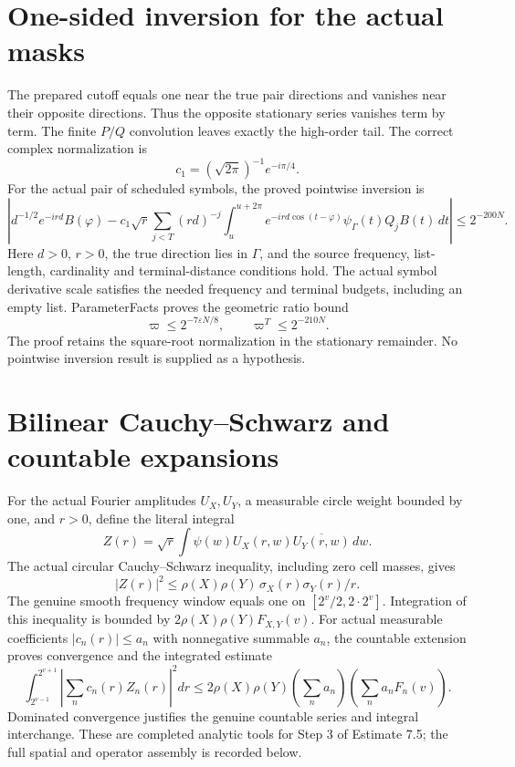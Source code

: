 \documentclass[11pt]{article}
\begin{document}
\newpage
\section*{One-sided inversion for the actual masks}
The prepared cutoff equals one near the true pair directions and vanishes
near their opposite directions. Thus the opposite stationary series vanishes
term by term. The finite $P/Q$ convolution leaves exactly the high-order tail.
The correct complex normalization is
\[
c_1=(\sqrt{2\pi})^{-1}e^{-i\pi/4}.
\]
For the actual pair of scheduled symbols, the proved pointwise inversion is
\[
\left|d^{-1/2}e^{-ird}B(\varphi)-c_1\sqrt r
\sum_{j<T}(rd)^{-j}\int_u^{u+2\pi}e^{-ird\cos(t-\varphi)}
\psi_\Gamma(t)Q_jB(t)\,dt\right|\le2^{-200N}.
\]
Here $d>0$, $r>0$, the true direction lies in $\Gamma$, and the source frequency,
list-length, cardinality and terminal-distance conditions hold. The actual
symbol derivative scale satisfies the needed frequency and terminal budgets,
including an empty list. ParameterFacts proves the geometric ratio bound
\[
\varpi\le2^{-7\varepsilon N/8},\qquad \varpi^T\le2^{-210N}.
\]
The proof retains the square-root normalization in the stationary remainder.
No pointwise inversion result is supplied as a hypothesis.

\newpage
\section*{Bilinear Cauchy--Schwarz and countable expansions}
For the actual Fourier amplitudes $U_X,U_Y$, a measurable circle weight bounded
by one, and $r>0$, define the literal integral
\[
Z(r)=\sqrt r\int\psi(w)U_X(r,w)\overline{U_Y(r,w)}\,dw.
\]
The actual circular Cauchy--Schwarz inequality, including zero cell masses, gives
\[
|Z(r)|^2\le\rho(X)\rho(Y)\,\sigma_X(r)\sigma_Y(r)/r.
\]
The genuine smooth frequency window equals one on $[2^v/2,2\cdot2^v]$.
Integration of this inequality is bounded by $2\rho(X)\rho(Y)F_{X,Y}(v)$.
For actual measurable coefficients $|c_n(r)|\le a_n$ with nonnegative summable $a_n$,
the countable extension proves convergence and the integrated estimate
\[
\int_{2^{v-1}}^{2^{v+1}}\left|\sum_n c_n(r)Z_n(r)\right|^2dr
\le2\rho(X)\rho(Y)\left(\sum_n a_n\right)
\left(\sum_n a_nF_n(v)\right).
\]
Dominated convergence justifies the genuine countable series and integral
interchange. These are completed analytic tools for Step 3 of Estimate 7.5;
the full spatial and operator assembly is recorded below.

\newpage
\end{document}
